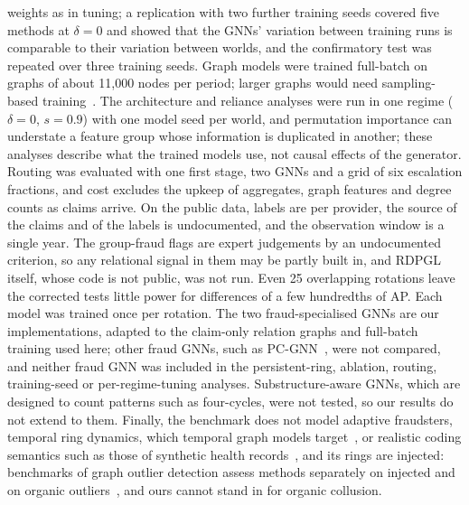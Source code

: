 \documentclass[pdflatex,sn-vancouver-num]{sn-jnl}
\begin{document}
weights as in tuning; a replication with two further training seeds covered
five methods at $\delta=0$ and showed that the GNNs' variation between
training runs is comparable to their variation between worlds, and the
confirmatory test was repeated over three training seeds. Graph models were trained
full-batch on graphs of about 11{,}000 nodes per period; larger graphs would
need sampling-based training~\cite{hamilton2017sage}. The architecture and
reliance analyses were run in one regime ($\delta=0$, $s=0.9$) with one
model seed per world, and permutation importance can understate a feature
group whose information is duplicated in another; these analyses describe
what the trained models use, not causal effects of the generator. Routing was
evaluated with one first stage, two GNNs and a grid of six escalation
fractions, and cost excludes the upkeep of aggregates, graph features and
degree counts as claims arrive.
On the public data, labels are per provider, the source of the claims and of
the labels is undocumented, and the observation window is a single year. The
group-fraud flags are expert judgements by an undocumented criterion, so any
relational signal in them may be partly built in, and RDPGL itself, whose code
is not public, was not run.
Even 25 overlapping rotations leave the corrected tests little power for
differences of a few hundredths of AP. Each model was trained once per
rotation.
The two fraud-specialised GNNs are our implementations, adapted to the
claim-only relation graphs and full-batch training used here; other fraud
GNNs, such as PC-GNN~\cite{liu2021pcgnn}, were not compared, and neither
fraud GNN was included in the persistent-ring, ablation, routing,
training-seed or per-regime-tuning analyses. Substructure-aware GNNs, which
are designed to count patterns such as four-cycles, were not tested, so our
results do not extend to them.
Finally, the benchmark does not model adaptive fraudsters, temporal ring
dynamics, which temporal graph models target~\cite{rossi2020tgn}, or
realistic coding semantics such as those of synthetic health
records~\cite{walonoski2018synthea}, and its rings are injected: benchmarks of
graph outlier detection assess methods separately on injected and on organic
outliers~\cite{liu2022bond}, and ours cannot stand in for organic collusion.
\end{document}
